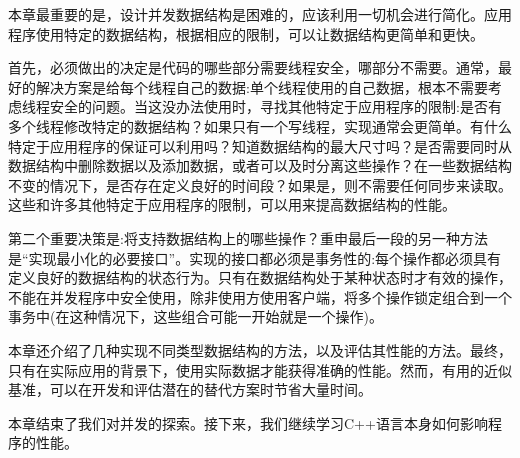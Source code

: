 本章最重要的是，设计并发数据结构是困难的，应该利用一切机会进行简化。应用程序使用特定的数据结构，根据相应的限制，可以让数据结构更简单和更快。 

首先，必须做出的决定是代码的哪些部分需要线程安全，哪部分不需要。通常，最好的解决方案是给每个线程自己的数据:单个线程使用的自己数据，根本不需要考虑线程安全的问题。当这没办法使用时，寻找其他特定于应用程序的限制:是否有多个线程修改特定的数据结构？如果只有一个写线程，实现通常会更简单。有什么特定于应用程序的保证可以利用吗？知道数据结构的最大尺寸吗？是否需要同时从数据结构中删除数据以及添加数据，或者可以及时分离这些操作？在一些数据结构不变的情况下，是否存在定义良好的时间段？如果是，则不需要任何同步来读取。这些和许多其他特定于应用程序的限制，可以用来提高数据结构的性能。 

第二个重要决策是:将支持数据结构上的哪些操作？重申最后一段的另一种方法是“实现最小化的必要接口”。实现的接口都必须是事务性的:每个操作都必须具有定义良好的数据结构的状态行为。只有在数据结构处于某种状态时才有效的操作，不能在并发程序中安全使用，除非使用方使用客户端，将多个操作锁定组合到一个事务中(在这种情况下，这些组合可能一开始就是一个操作)。

本章还介绍了几种实现不同类型数据结构的方法，以及评估其性能的方法。最终，只有在实际应用的背景下，使用实际数据才能获得准确的性能。然而，有用的近似基准，可以在开发和评估潜在的替代方案时节省大量时间。 

本章结束了我们对并发的探索。接下来，我们继续学习C++语言本身如何影响程序的性能。